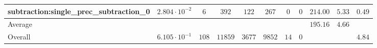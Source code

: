 \begin{tabular}{|l|c|c|c|c|c|c|c|c|c|c|}
subtraction:single\_prec\_subtraction\_0         & $ 2.804 \cdot 10^{-2} $ & $ 6      $ & $ 392   $ & $ 122  $ & $ 267   $ & $ 0  $ & $ 0 $ & $ 214.00      $ & $ 5.33    $ & $ 0.49    $ \\
\hline
Average                                          & $                     $ & $        $ & $       $ & $      $ & $       $ & $    $ & $   $ & $ 195.16      $ & $ 4.66    $ & $         $ \\
\hline
Overall                                          & $ 6.105 \cdot 10^{-1} $ & $ 108    $ & $ 11859 $ & $ 3677 $ & $ 9852  $ & $ 14 $ & $ 0 $ & $             $ & $         $ & $ 4.84    $ \\
\hline
\end{tabular}
